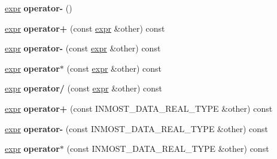 \begin{DoxyCompactItemize}
\item 
\hypertarget{classINMOST_1_1expr_a603800224aa7fc8d49c17c4f95eb0aea}{\hyperlink{classINMOST_1_1expr}{expr} {\bfseries operator-\/} ()}\label{classINMOST_1_1expr_a603800224aa7fc8d49c17c4f95eb0aea}

\item 
\hypertarget{classINMOST_1_1expr_aeed15eca928ef41eba438c7fc9cfe880}{\hyperlink{classINMOST_1_1expr}{expr} {\bfseries operator+} (const \hyperlink{classINMOST_1_1expr}{expr} \&other) const }\label{classINMOST_1_1expr_aeed15eca928ef41eba438c7fc9cfe880}

\item 
\hypertarget{classINMOST_1_1expr_a07df50248f0d109c9bdeb98e892b2ebe}{\hyperlink{classINMOST_1_1expr}{expr} {\bfseries operator-\/} (const \hyperlink{classINMOST_1_1expr}{expr} \&other) const }\label{classINMOST_1_1expr_a07df50248f0d109c9bdeb98e892b2ebe}

\item 
\hypertarget{classINMOST_1_1expr_a2b20cd2457a3ca57610c9ad464ab4bb7}{\hyperlink{classINMOST_1_1expr}{expr} {\bfseries operator$\ast$} (const \hyperlink{classINMOST_1_1expr}{expr} \&other) const }\label{classINMOST_1_1expr_a2b20cd2457a3ca57610c9ad464ab4bb7}

\item 
\hypertarget{classINMOST_1_1expr_a5baed82f717d699d1b2d0df6cfcbbb02}{\hyperlink{classINMOST_1_1expr}{expr} {\bfseries operator/} (const \hyperlink{classINMOST_1_1expr}{expr} \&other) const }\label{classINMOST_1_1expr_a5baed82f717d699d1b2d0df6cfcbbb02}

\item 
\hypertarget{classINMOST_1_1expr_a191ca0e4d5ff678377a07310e33aeaa0}{\hyperlink{classINMOST_1_1expr}{expr} {\bfseries operator+} (const I\-N\-M\-O\-S\-T\-\_\-\-D\-A\-T\-A\-\_\-\-R\-E\-A\-L\-\_\-\-T\-Y\-P\-E \&other) const }\label{classINMOST_1_1expr_a191ca0e4d5ff678377a07310e33aeaa0}

\item 
\hypertarget{classINMOST_1_1expr_a5989315cc9a6c0017f706b51f5b96c36}{\hyperlink{classINMOST_1_1expr}{expr} {\bfseries operator-\/} (const I\-N\-M\-O\-S\-T\-\_\-\-D\-A\-T\-A\-\_\-\-R\-E\-A\-L\-\_\-\-T\-Y\-P\-E \&other) const }\label{classINMOST_1_1expr_a5989315cc9a6c0017f706b51f5b96c36}

\item 
\hypertarget{classINMOST_1_1expr_ae5e6f1a9529fb7600499d5c6d0ccd43d}{\hyperlink{classINMOST_1_1expr}{expr} {\bfseries operator$\ast$} (const I\-N\-M\-O\-S\-T\-\_\-\-D\-A\-T\-A\-\_\-\-R\-E\-A\-L\-\_\-\-T\-Y\-P\-E \&other) const }\label{classINMOST_1_1expr_ae5e6f1a9529fb7600499d5c6d0ccd43d}


\end{DoxyCompactItemize}
